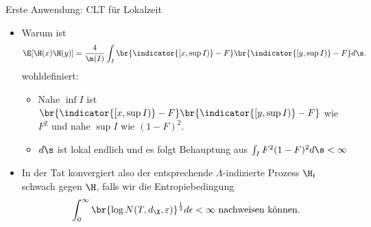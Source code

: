 \begin{frame}{Erste Anwendung: CLT für Lokalzeit}
    \begin{proofs}
    \begin{itemize}
        \item Warum ist \[
        \E[\H(x)\H(y)] = \frac{4}{\m(I)} \int_I \br{\indicator{[x, \sup I)} - F}\br{\indicator{[y, \sup I)} - F} d \s.
        \] wohldefiniert: 
        \begin{itemize}
            \item Nahe $\inf I$ ist $\br{\indicator{[x, \sup I)} - F}\br{\indicator{[y, \sup I)} - F}$ wie $F^2$ und nahe $\sup I$ wie $(1-F)^2$. 
            \item $d\s$ ist lokal endlich und es folgt Behauptung aus $\int_I F^2(1-F)^2 d\s < \infty$
        \end{itemize}
        \item In der Tat konvergiert also der entsprechende $\Lambda$-indizierte Prozess $\H_t$ schwach gegen $\H$, falls wir die Entropiebedingung \[
\int_0^\infty \br{\log N(T, d_\X, \varepsilon)}^\frac{1}{2} d\epsilon < \infty \text{ nachweisen können.}
        \] 
    \end{itemize}
        
    \end{proofs}
\end{frame}

